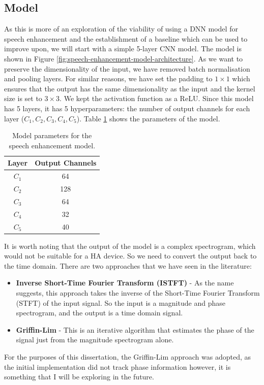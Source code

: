 \documentclass[logo,bsc,singlespacing,parskip,online]{infthesis}
\begin{document}
\subsection{Model}
\label{sec:se-model}
As this is more of an exploration of the viability of using a DNN model for speech enhancement 
and the establishment of a baseline which can be used to improve upon, we will start 
with a simple 5-layer CNN model. The model is shown in Figure \ref{fig:speech-enhancement-model-architecture}.
As we want to preserve the dimensionality of the input, we 
have removed batch normalisation and pooling layers.
For similar reasons, we have set the padding to $1\times 1$ which ensures that the output has the same dimensionality as the input
and the kernel size is set to $3\times 3$. We kept the activation function as a ReLU.
Since this model has 5 layers, it has 5 hyperparameters: the number of output channels for each layer ($C_1, C_2, C_3, C_4, C_5$).
Table \ref{tab:speech-enhancement-model-params} shows the parameters of the model.

\begin{table}[h]
   \centering
   \begin{tabular}{|c|c|}
      \hline
      Layer & Output Channels \\
      \hline
      $C_1$ & 64 \\
      $C_2$ & 128 \\
      $C_3$ & 64 \\
      $C_4$ & 32 \\
      $C_5$ & 40 \\
      \hline
   \end{tabular}
   \caption{Model parameters for the speech enhancement model.}
   \label{tab:speech-enhancement-model-params}
\end{table}

It is worth noting that the output of the model is a complex spectrogram, which would 
not be suitable for a HA device. So we need to convert the output back to the time domain. 
There are two approaches that we have seen in the literature:
\begin{itemize}
   \item \textbf{Inverse Short-Time Fourier Transform (ISTFT)} - As the name suggests, this approach takes the inverse of the Short-Time Fourier Transform (STFT) of the input signal.
   So the input is a magnitude and phase spectrogram, and the output is a time domain signal. 
   \item \textbf{Griffin-Lim} - This is an iterative algorithm that estimates the phase of the signal just from the magnitude spectrogram alone. 
\end{itemize}
For the purposes of this dissertation, the Griffin-Lim approach was adopted, as the initial implementation did not track phase information however,
it is something that I will be exploring in the future.
\end{document}
